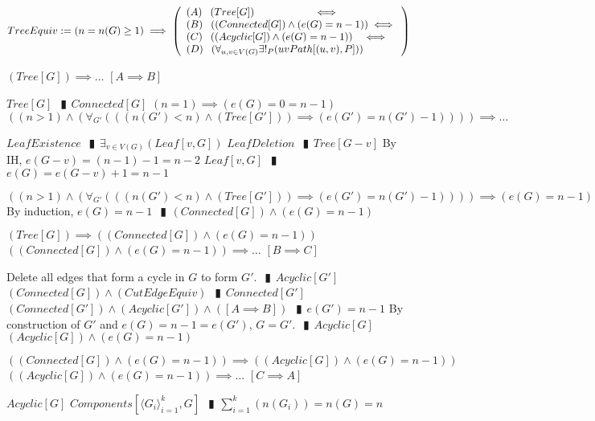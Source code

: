 \documentclass{book}
\newcommand{\abr}{:=}
\newcommand{\pipe}{$\phantom{(}\vrectangleblack\phantom{)}$}
\begin{document}
$TreeEquiv \abr (n = n(G) \geq 1) \implies
\left(\begin{array}{ll}
  (A) \phantom{-} (Tree[G]) \hfill \iff \hfill \\
  (B) \phantom{-} ((Connected[G]) \land (e(G) = n - 1)) \hfill \iff \hfill \\
  (C) \phantom{-} ((Acyclic[G]) \land (e(G) = n - 1)) \hfill \iff \hfill \\
  (D) \phantom{-} (\forall_{u, v \in V(G)} \exists!_{P}(uvPath[(u, v), P]))
\end{array}\right)$ \\
\begin{enumerate}
  \lit $(Tree[G]) \implies \ldots$    $[A \implies B]$
  \begin{enumerate}
    \lit $Tree[G]$ \pipe $Connected[G]$
    \lit $(n = 1) \implies (e(G) = 0 = n - 1)$
    \lit $((n > 1) \land (\forall_{G'}(((n(G') < n) \land (Tree[G'])) \implies (e(G') = n(G') - 1)))) \implies \ldots$
    \begin{enumerate}
      \lit $LeafExistence$ \pipe $\exists_{v \in V(G)}(Leaf[v, G])$
      \lit $LeafDeletion$ \pipe $Tree[G - v]$
      \lit By IH, $e(G - v) = (n - 1) - 1 = n - 2$
      \lit $Leaf[v, G]$ \pipe $e(G) = e(G - v) + 1 = n - 1$
    \end{enumerate}
    \lit $((n > 1) \land (\forall_{G'}(((n(G') < n) \land (Tree[G'])) \implies (e(G') = n(G') - 1)))) \implies (e(G) = n - 1)$
    \lit By induction, $e(G) = n - 1$ \pipe $(Connected[G]) \land (e(G) = n - 1)$
  \end{enumerate}
  \lit $(Tree[G]) \implies ((Connected[G]) \land (e(G) = n - 1))$
  \lit $((Connected[G]) \land (e(G) = n - 1)) \implies \ldots$    $[B \implies C]$
  \begin{enumerate}
    \lit Delete all edges that form a cycle in $G$ to form $G'$. \pipe $Acyclic[G']$
    \lit $(Connected[G]) \land (CutEdgeEquiv)$ \pipe $Connected[G']$
    \lit $(Connected[G']) \land (Acyclic[G']) \land ([A \implies B])$ \pipe $e(G') = n - 1$
    \lit By construction of $G'$ and $e(G) = n - 1 = e(G')$, $G = G'$. \pipe $Acyclic[G]$
    \lit $(Acyclic[G]) \land (e(G) = n - 1)$
  \end{enumerate}
  \lit $((Connected[G]) \land (e(G) = n - 1)) \implies ((Acyclic[G]) \land (e(G) = n - 1))$
  \lit $((Acyclic[G]) \land (e(G) = n - 1)) \implies \ldots$    $[C \implies A]$
  \begin{enumerate}
    \lit $Acyclic[G]$
    \lit $Components[\langle G_i \rangle_{i = 1}^k, G]$ \pipe $\sum \limits_{i = 1}^k(n(G_i)) = n(G) = n$

\end{enumerate}
\end{enumerate}
\end{document}
